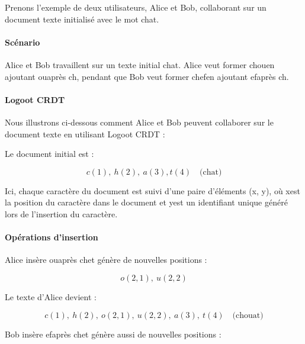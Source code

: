 Prenons l'exemple de deux utilisateurs, Alice et Bob, collaborant sur un document texte initialisé avec le mot \guillemotleft chat\guillemotright.

\paragraph{Scénario}
Alice et Bob travaillent sur un texte initial \guillemotleft chat\guillemotright. Alice veut former \guillemotleft chou\guillemotright en ajoutant \guillemotleft ou\guillemotright après \guillemotleft ch\guillemotright, pendant que Bob veut former \guillemotleft chef\guillemotright en ajoutant \guillemotleft ef\guillemotright après \guillemotleft ch\guillemotright.

\paragraph{Logoot \gls{CRDT}}
Nous illustrons ci-dessous comment Alice et Bob peuvent collaborer sur le document texte en utilisant Logoot \gls{CRDT} :

Le document initial est :

\begin{equation}
    c(1),\ h(2), \ a(3), t(4) \quad \text{(chat)}
\end{equation}

Ici, chaque caractère du document est suivi d'une paire d'éléments \guillemotleft (x, y)\guillemotright, où \guillemotleft x\guillemotright est la position du caractère dans le document et \guillemotleft y\guillemotright est un identifiant unique généré lors de l'insertion du caractère.

\paragraph{Opérations d'insertion}
Alice insère \guillemotleft ou\guillemotright après \guillemotleft ch\guillemotright et génère de nouvelles positions :

\begin{equation}
    o(2, 1), \ u(2, 2)
\end{equation}

Le texte d'Alice devient :

\begin{equation}
    c(1), \ h(2), \ o(2, 1), \ u(2, 2), \ a(3), \ t(4) \quad \text{(chouat)}
\end{equation}

Bob insère \guillemotleft ef\guillemotright après \guillemotleft ch\guillemotright et génère aussi de nouvelles positions :


